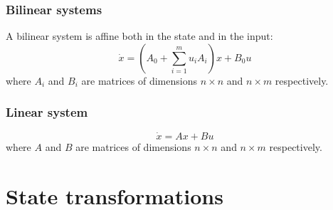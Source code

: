 \documentclass[12pt, openany]{report}
\theoremstyle{definition}
\begin{document}
\subsection{Bilinear systems}
A bilinear system is affine both in the state and in the input:
\begin{equation}
    \dot x = \left(A_0 + \sum_{i=1}^mu_iA_i\right) x + B_0u 
\end{equation}
where \(A_i\) and \(B_i\) are matrices of dimensions \(n\times n\) and \(n\times m\) respectively. 
\subsection{Linear system}
\begin{equation}
    \dot x = Ax + Bu
\end{equation}
where \(A\) and \(B\) are matrices of dimensions \(n\times n\) and \(n\times m\) respectively. 
\chapter{State transformations}
\end{document}
